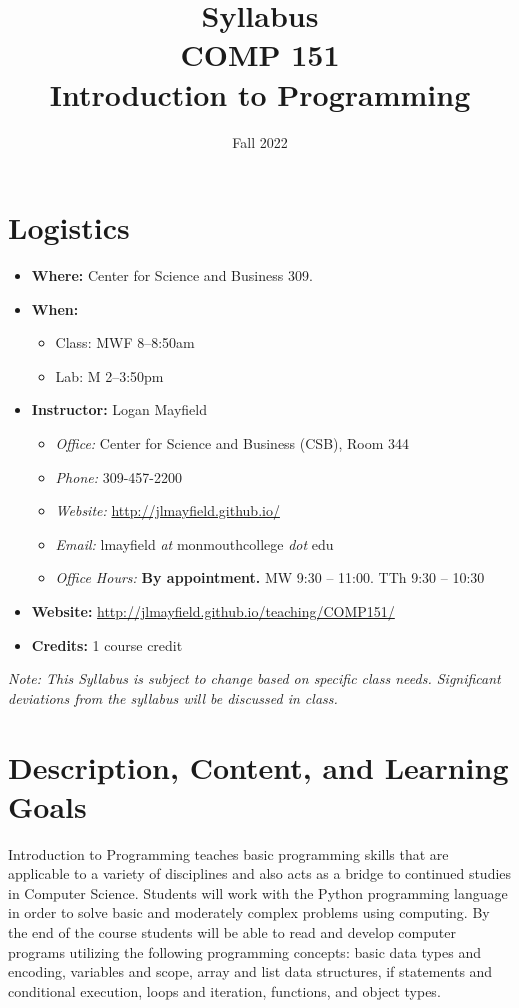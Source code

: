\documentclass[10pt]{article}
\title{Syllabus \\ COMP 151 \\ Introduction to Programming}
\author{  }
\date{Fall 2022}
\begin{document}
\maketitle

\section{Logistics}
\begin{itemize}
\item \textbf{Where: } Center for Science and Business 309.
\item \textbf{When: }
\begin{itemize}
  \item Class: MWF 8--8:50am
  \item Lab: M 2--3:50pm
\end{itemize}
\item \textbf{Instructor: } Logan Mayfield
\begin{itemize}
\item \textit{Office: } Center for Science and Business (CSB), Room 344
\item \textit{Phone: } 309-457-2200 %
\item \textit{Website: } \url{http://jlmayfield.github.io/}
\item \textit{Email: } lmayfield \textit{at} monmouthcollege \textit{dot} edu
\item \textit{Office Hours: }  \textbf{By appointment.} MW 9:30 -- 11:00. TTh 9:30 -- 10:30
\end{itemize}
\item \textbf{Website: } \url{http://jlmayfield.github.io/teaching/COMP151/}
\item \textbf{Credits: } 1 course credit
\end{itemize}
\emph{Note: This Syllabus is subject to change based on specific class needs. Significant deviations from the syllabus will be discussed in class.}


\section{Description, Content, and Learning Goals}

Introduction to Programming teaches basic programming skills that are applicable to a variety of disciplines and also acts as a bridge to continued studies in Computer Science. Students will work with the Python programming language in order to solve basic and moderately complex problems using computing. By the end of the course students will be able to read and develop computer programs utilizing the following programming concepts: basic data types and encoding, variables and scope, array and list data structures, if statements and conditional execution, loops and iteration, functions, and object types.
\end{document}
